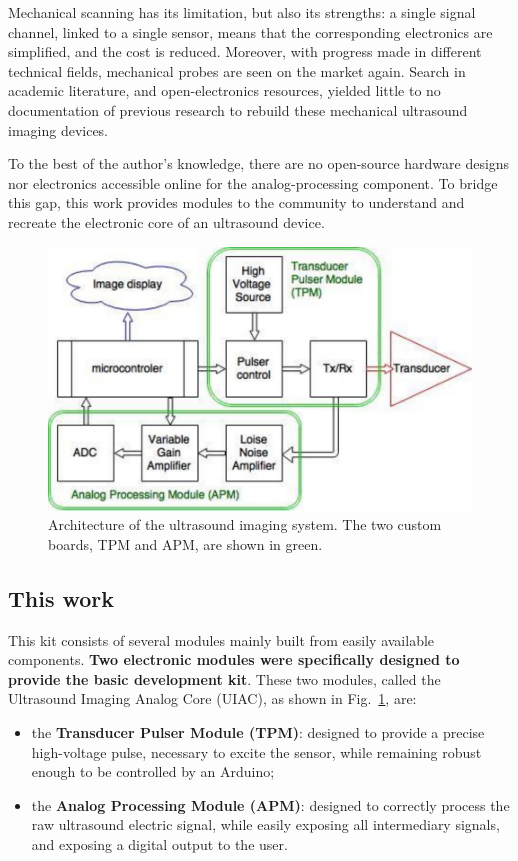 \documentclass[letterpaper, 10 pt, conference]{ieeeconf} %
\begin{document}
Mechanical scanning has its limitation, but also its strengths: a single signal channel, linked to a single sensor, means that the corresponding electronics are simplified, and the cost is reduced. Moreover, with progress made in different technical fields, mechanical probes are seen on the market again. Search in academic literature, and open-electronics resources, yielded little to no documentation of previous research to rebuild these mechanical ultrasound imaging devices.

To the best of the author's knowledge, there are no open-source hardware designs nor electronics accessible online for the analog-processing component. To bridge this gap, this work provides modules to the community to understand and recreate the electronic core of an ultrasound device. 

\begin{figure}%
\centering
\includegraphics[width=.98\linewidth]{fullprinciples.pdf}
\caption{Architecture of the ultrasound imaging system. The two custom boards, TPM and APM, are shown in green.}
\label{fig:UIAC}
\end{figure}

\subsection{This work}

This kit consists of several modules mainly built from easily available components. \textbf{Two electronic modules were specifically designed to provide the basic development kit}. These two modules, called the Ultrasound Imaging Analog Core (UIAC), as shown in Fig.~\ref{fig:UIAC}, are:

\begin{itemize}
\item the \textbf{Transducer Pulser Module (TPM)}: designed to provide a precise high-voltage pulse, necessary to excite the sensor, while remaining robust enough to be controlled by an Arduino;  
\item the \textbf{Analog Processing Module (APM)}: designed to correctly process the raw ultrasound electric signal, while easily exposing all intermediary signals, and exposing a digital output to the user. 
\end{itemize}
\end{document}
